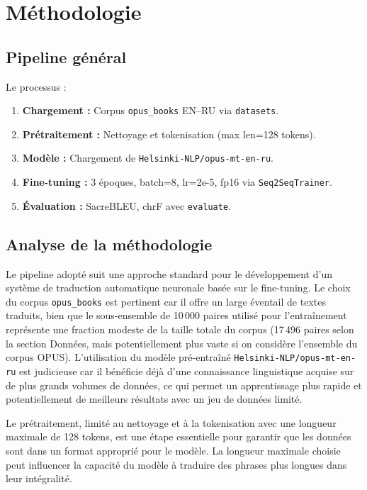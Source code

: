 \documentclass[11pt,a4paper]{article}
\begin{document}
\section{Méthodologie}
\subsection{Pipeline général}
Le processus :
\begin{enumerate}
\item \textbf{Chargement :} Corpus \texttt{opus\_books}\citep{Tiedemann2009Parallel} EN–RU via \texttt{datasets}\citep{Lhoest2021Datasets}.
\item \textbf{Prétraitement :} Nettoyage et tokenisation (max len=128 tokens).
\item \textbf{Modèle :} Chargement de \texttt{Helsinki-NLP/opus-mt-en-ru}\citep{Junczys-Dowmunt2018Marian}.
\item \textbf{Fine-tuning :} 3 époques, batch=8, lr=2e-5, fp16 via \texttt{Seq2SeqTrainer}.
\item \textbf{Évaluation :} SacreBLEU, chrF avec \texttt{evaluate}\citep{Lhoest2021Datasets}.
\end{enumerate}
\clearpage
\subsection{Analyse de la méthodologie}
Le pipeline adopté suit une approche standard pour le développement d'un système de traduction automatique neuronale basée sur le fine-tuning. Le choix du corpus \texttt{opus\_books} est pertinent car il offre un large éventail de textes traduits, bien que le sous-ensemble de 10\,000 paires utilisé pour l'entraînement représente une fraction modeste de la taille totale du corpus (17\,496 paires selon la section Données, mais potentiellement plus vaste si on considère l'ensemble du corpus OPUS). L'utilisation du modèle pré-entraîné \texttt{Helsinki-NLP/opus-mt-en-ru} est judicieuse car il bénéficie déjà d'une connaissance linguistique acquise sur de plus grands volumes de données, ce qui permet un apprentissage plus rapide et potentiellement de meilleurs résultats avec un jeu de données limité.

Le prétraitement, limité au nettoyage et à la tokenisation avec une longueur maximale de 128 tokens, est une étape essentielle pour garantir que les données sont dans un format approprié pour le modèle. La longueur maximale choisie peut influencer la capacité du modèle à traduire des phrases plus longues dans leur intégralité.
\end{document}
